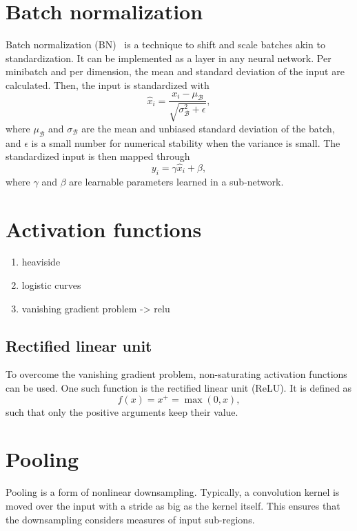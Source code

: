 \section{Batch normalization}\label{sec:bn}
Batch normalization (BN)~\cite{Ioffe2015} is a technique to shift and scale batches akin to standardization.
It can be implemented as a layer in any neural network.
Per minibatch and per dimension, the mean and standard deviation of the input are calculated.
Then, the input is standardized with
\begin{equation}
    \hat{x}_i = \frac{x_i - \mu_\mathcal{B}}{\sqrt{\sigma_\mathcal{B}^2 + \epsilon}},
\end{equation}
where $\mu_\mathcal{B}$ and $\sigma_\mathcal{B}$ are the mean and unbiased standard deviation of the batch, and $\epsilon$ is a small number for numerical stability when the variance is small.
The standardized input is then mapped through
\begin{equation}
    y_i = \gamma \hat{x}_i + \beta,
\end{equation}
where $\gamma$ and $\beta$ are learnable parameters learned in a sub-network.

\section{Activation functions}\label{sec:activations}

\begin{enumerate}
    \item heaviside
    \item logistic curves
    \item vanishing gradient problem -> relu
\end{enumerate}

\subsection{Rectified linear unit}\label{subsec:relu}
To overcome the vanishing gradient problem, non-saturating activation functions can be used.
One such function is the rectified linear unit (ReLU).
It is defined as
\begin{equation}
    f(x) = x^+ = \max(0, x),
\end{equation}
such that only the positive arguments keep their value.

\section{Pooling}\label{sec:pooling}
Pooling is a form of nonlinear downsampling.
Typically, a convolution kernel is moved over the input with a stride as big as the kernel itself.
This ensures that the downsampling considers measures of input sub-regions.

